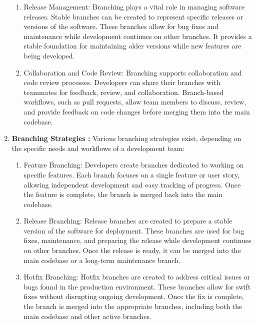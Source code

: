\begin{enumerate}
\begin{enumerate}
        \item Release Management: Branching plays a vital role in managing software releases. Stable branches can be created to represent specific releases or versions of the software. These branches allow for bug fixes and maintenance while development continues on other branches. It provides a stable foundation for maintaining older versions while new features are being developed.

        \item Collaboration and Code Review: Branching supports collaboration and code review processes. Developers can share their branches with teammates for feedback, review, and collaboration. Branch-based workflows, such as pull requests, allow team members to discuss, review, and provide feedback on code changes before merging them into the main codebase.
    \end{enumerate}
    \item \textbf{Branching Strategies : }Various branching strategies exist, depending on the specific needs and workflows of a development team:
    \begin{enumerate}
        \item Feature Branching: Developers create branches dedicated to working on specific features. Each branch focuses on a single feature or user story, allowing independent development and easy tracking of progress. Once the feature is complete, the branch is merged back into the main codebase.

       \item Release Branching: Release branches are created to prepare a stable version of the software for deployment. These branches are used for bug fixes, maintenance, and preparing the release while development continues on other branches. Once the release is ready, it can be merged into the main codebase or a long-term maintenance branch.

        \item Hotfix Branching: Hotfix branches are created to address critical issues or bugs found in the production environment. These branches allow for swift fixes without disrupting ongoing development. Once the fix is complete, the branch is merged into the appropriate branches, including both the main codebase and other active branches.


\end{enumerate}
\end{enumerate}
